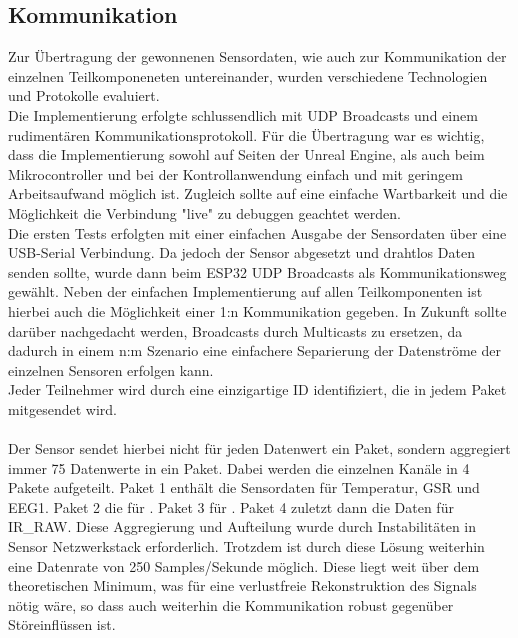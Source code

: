 \subsection{Kommunikation} \label{grund-kommunikation}

Zur Übertragung der gewonnenen Sensordaten, wie auch zur Kommunikation der einzelnen Teilkomponeneten untereinander, wurden verschiedene Technologien und Protokolle evaluiert.\\
Die Implementierung erfolgte schlussendlich mit UDP Broadcasts und einem rudimentären Kommunikationsprotokoll.
Für die Übertragung war es wichtig, dass die Implementierung sowohl auf Seiten der Unreal Engine, als auch beim Mikrocontroller und bei der Kontrollanwendung einfach und mit geringem Arbeitsaufwand möglich ist.
Zugleich sollte auf eine einfache Wartbarkeit und die Möglichkeit die Verbindung "live" zu debuggen geachtet werden. \\
Die ersten Tests erfolgten mit einer einfachen Ausgabe der Sensordaten über eine USB-Serial Verbindung.
Da jedoch der Sensor abgesetzt und drahtlos Daten senden sollte, wurde dann beim ESP32 UDP Broadcasts als Kommunikationsweg gewählt. Neben der einfachen Implementierung auf allen Teilkomponenten ist hierbei auch die Möglichkeit einer 1:n Kommunikation gegeben.
In Zukunft sollte darüber nachgedacht werden, Broadcasts durch Multicasts zu ersetzen, da dadurch in einem n:m Szenario eine einfachere Separierung der Datenströme der einzelnen Sensoren erfolgen kann. \\
Jeder Teilnehmer wird durch eine einzigartige ID identifiziert, die in jedem Paket mitgesendet wird. \\
[BILD EINFÜGEN UNTERSCHIEDLICHE DATENPAKETE]\\
Der Sensor sendet hierbei nicht für jeden Datenwert ein Paket, sondern aggregiert immer 75 Datenwerte in ein Paket. Dabei werden die einzelnen Kanäle in 4 Pakete aufgeteilt.
Paket 1 enthält die Sensordaten für Temperatur, GSR und EEG1. Paket 2 die für . Paket 3 für . Paket 4 zuletzt dann die Daten für IR_RAW. Diese Aggregierung und Aufteilung wurde durch Instabilitäten in Sensor Netzwerkstack erforderlich.
Trotzdem ist durch diese Lösung weiterhin eine Datenrate von 250 Samples/Sekunde möglich. Diese liegt weit über dem theoretischen Minimum, was für eine verlustfreie Rekonstruktion des Signals nötig wäre, so dass auch weiterhin die Kommunikation robust gegenüber Störeinflüssen ist.



